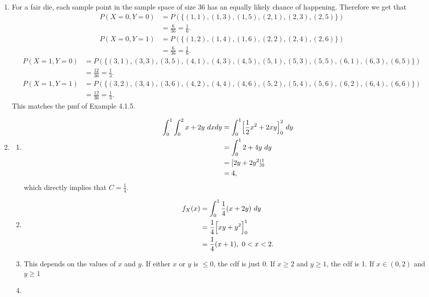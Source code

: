 \documentclass{article}
\begin{document}
\begin{enumerate}
    \item For a fair die, each sample point in the sample space of size 36 has an equally likely chance of 
    happening. Therefore we get that 
    \begin{align*}
        P(X = 0, Y = 0)
        &= P(\{
            (1, 1), (1, 3), (1, 5), (2, 1), (2, 3), (2, 5)
        \}) \\
        &= \frac{6}{36} = \frac{1}{6}.
    \end{align*}
    \begin{align*}
        P(X = 0, Y = 1) 
        &= P(\{
            (1, 2), (1, 4), (1, 6), (2, 2), (2, 4), (2, 6)
        \}) \\
        &= \frac{6}{36} = \frac{1}{6}.
    \end{align*}
    \begin{align*}
        P(X = 1, Y = 0) 
        &= P(\{
            (3, 1), (3, 3), (3, 5), (4, 1), (4, 3), (4, 5), (5, 1), (5, 3), (5, 5), (6, 1), (6, 3), (6, 5)
        \}) \\
        &= \frac{12}{36} = \frac{1}{3}.
    \end{align*}
    \begin{align*}
        P(X = 1, Y = 1) 
        &= P(\{
            (3, 2), (3, 4), (3, 6), (4, 2), (4, 4), (4, 6), (5, 2), (5, 4), (5, 6), (6, 2), (6, 4), (6, 6)
        \}) \\
        &= \frac{12}{36} = \frac{1}{3}.
    \end{align*}
    This matches the pmf of Example 4.1.5.

    \item \begin{enumerate}
        \item \begin{align*}
            \int_{0}^{1} \int_{0}^{2} x + 2y \ dxdy
            &= \int_{0}^{1} \Bigl[ \frac{1}{2}x^2 + 2xy \Bigr]_0^2 \ dy \\
            &= \int_{0}^{1} 2 + 4y \ dy \\
            &= [2y + 2y^2]_0^1 \\
            &= 4,
        \end{align*}
        which directly implies that $C = \frac{1}{4}$.

        \item \begin{align*}
            f_X(x)
            &= \int_{0}^{1} \frac{1}{4}(x + 2y) \ dy \\
            &= \frac{1}{4} \Bigl[ xy + y^2 \Bigr]_0^1 \\
            &= \frac{1}{4} (x + 1), \ 0 < x < 2.
        \end{align*}

        \item This depends on the values of $x$ and $y$. If either $x$ or $y$ is $\leq 0$, the cdf is just 
        0. If $x \geq 2$ and $y \geq 1$, the cdf is 1. If $x \in (0, 2)$ and $y \geq 1$

        \item 
    \end{enumerate}


\end{enumerate}
\end{document}
